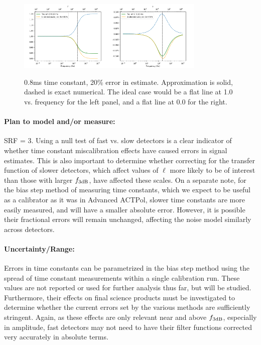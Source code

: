\begin{figure}[h!]
\centering
\includegraphics[width=0.4\textwidth]{figures/tau_ampl_error_800us_20pError.png}\quad\includegraphics[width=0.4\textwidth]{figures/tau_phase_error_800us_20pError.png}
\caption{0.8ms time constant, 20\% error in estimate. Approximation is solid, dashed is exact numerical. The ideal case would be a flat line at 1.0 vs. frequency for the left panel, and a flat line at 0.0 for the right.}
\label{tau_miscal}
\end{figure}

\paragraph{Plan to model and/or measure:}
SRF = 3. Using a null test of fast vs. slow detectors is a clear indicator of whether time constant miscalibration effects have caused errors in signal estimates. This is also important to determine whether correcting for the transfer function of slower detectors, which affect values of $\ell$ more likely to be of interest than those with larger $f_{\mbox{\scriptsize 3dB}}$, have affected these scales. On a separate note, for the bias step method of measuring time constants, which we expect to be useful as a calibrator as it was in Advanced ACTPol, slower time constants are more easily measured, and will have a smaller absolute error. However, it is possible their fractional errors will remain unchanged, affecting the noise model similarly across detectors.

\paragraph{Uncertainty/Range:}
Errors in time constants can be parametrized in the bias step method using the spread of time constant measurements within a single calibration run. These values are not reported or used for further analysis thus far, but will be studied. Furthermore, their effects on final science products must be investigated to determine whether the current errors set by the various methods are sufficiently stringent. Again, as these effects are only relevant near and above $f_{\mbox{\scriptsize 3dB}}$, especially in amplitude, fast detectors may not need to have their filter functions corrected very accurately in absolute terms.

